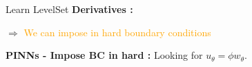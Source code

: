 \begin{frame}{Learn LevelSet }
	\textbf{Derivatives :}

	\begin{center}
	\end{center}
	
	 $\Rightarrow$ \textcolor{orange}{We can impose in hard boundary conditions}
	
	\textbf{PINNs - Impose BC in hard :} Looking for $u_\theta=\phi w_\theta$.
	\begin{center}
	\end{center}
\end{frame}